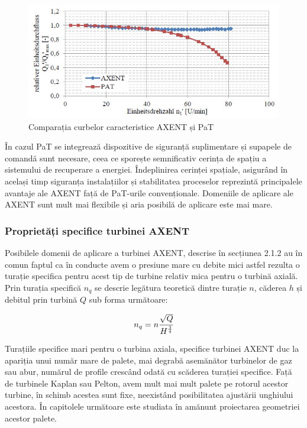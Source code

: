 \begin{figure}[h!]
	\centering
	\includegraphics[scale=0.7]{figures/axent-pat.jpg}
	\caption{Comparația curbelor caracteristice AXENT și PaT \protect\cite{neipp2017zweistufige}}
	\label{Comparația curbelor caracteristice AXENT și PaT\u{a}}
\end{figure}

În cazul PaT se integrează dispozitive de siguranță suplimentare și supapele de comandă sunt necesare, ceea ce sporește semnificativ cerința de spațiu a sistemului de recuperare a energiei. Îndeplinirea cerinței spațiale, asigurând în același timp siguranța instalațiilor și stabilitatea proceselor reprezintă principalele avantaje ale AXENT față de PaT-urile convenționale. Domeniile de aplicare ale AXENT sunt mult mai flexibile și aria posibilă de aplicare este mai mare.


\subsubsection{Proprietăți specifice turbinei AXENT}

Posibilele domenii de aplicare a turbinei AXENT, descrise în secțiunea 2.1.2 au în comun faptul ca în conducte avem o presiune mare cu debite mici astfel rezulta o turație specifica pentru acest tip de turbine relativ mica pentru o turbină axială. Prin turația specifică \(n_q\) se descrie legătura teoretică dintre turație \(n\), căderea \(h\) și debitul prin turbină \(Q\) sub forma următoare:

\begin{equation}
n_q = n \cfrac{\sqrt{Q}}{H^\frac{3}{4}}
\end{equation}

Turațiile specifice mari pentru o turbina axiala, specifice turbinei AXENT duc la apariția unui număr mare de palete, mai degrabă asemănător turbinelor de gaz sau abur, numărul de profile crescând odată cu scăderea turației specifice. Față de turbinele Kaplan sau Pelton, avem mult mai mult palete pe rotorul acestor turbine, în schimb acestea sunt fixe, neexistând posibilitatea ajustării unghiului acestora. În capitolele următoare este studiata în amănunt proiectarea geometriei acestor palete.

